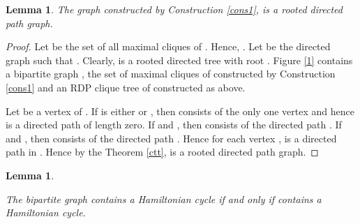 \documentclass[a4paper,12pt]{article}
\theoremstyle{plain}
\newtheorem{lemma}[theorem]{Lemma}
\theoremstyle{definition}
\theoremstyle{remark}
\begin{document}
\begin{lemma}\label{lemma1}
The graph  constructed by Construction \ref{cons1}, is a rooted
directed path graph.

\end{lemma}


\begin{proof}

Let  be the set of all maximal cliques of . Hence,
 .  Let  be the
directed graph such that . Clearly,  is a rooted directed tree with root .
Figure \ref{1} contains a bipartite graph , the set of maximal
cliques of  constructed by Construction \ref{cons1} and an RDP
clique tree  of   constructed as above.






\begin{figure}
\centerline{\hbox{}}
\end{figure}

Let  be a vertex of . If  is either  or ,
then  consists of the only one vertex and hence is
a directed path of length zero. If  and , then
 consists of the directed path . If  and
, then  consists of the directed path
. Hence for each
vertex ,  is a directed path in .
Hence by the Theorem \ref {ctt},  is a rooted directed path
graph.
\end{proof}

\begin{lemma}\label{lemma2}

The bipartite graph  contains a Hamiltonian cycle if and only if
  contains a Hamiltonian cycle.

\end{lemma}
\end{document}
